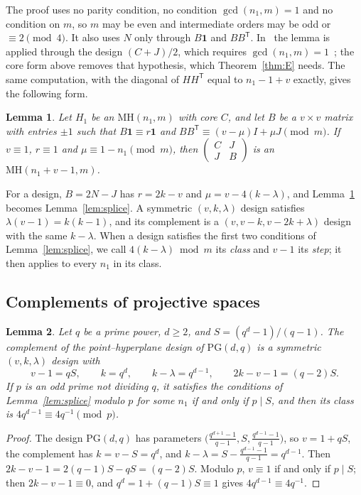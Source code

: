 \documentclass[10pt]{article}
\newtheorem{lemma}{Lemma}
\theoremstyle{remark}
\newcommand{\MH}{\mathrm{MH}}
\newcommand{\tr}{^{\mathsf T}}
\newcommand{\one}{\mathbf 1}
\newcommand{\PG}{\mathrm{PG}}
\begin{document}
The proof uses no parity condition, no condition $\gcd(n_1,m)=1$ and no condition on $m$, so $m$ may be even and intermediate orders may be odd or $\equiv2\pmod4$. It also uses $N$ only through $B\one$ and $BB\tr$. In~\cite{LS,K} the lemma is applied through the design $(C+J)/2$, which requires $\gcd(n_1,m)=1$~\cite[Lemma~3.4]{LS}; the core form above removes that hypothesis, which Theorem~\ref{thm:E} needs. The same computation, with the diagonal of $HH\tr$ equal to $n_1-1+v$ exactly, gives the following form.

\begin{lemma}\label{lem:general}
Let $H_1$ be an $\MH(n_1,m)$ with core $C$, and let $B$ be a $v\times v$ matrix with entries $\pm1$ such that $B\one\equiv r\one$ and $BB\tr\equiv(v-\mu)I+\mu J\pmod m$. If $v\equiv1$, $r\equiv1$ and $\mu\equiv1-n_1\pmod m$, then $\left(\begin{smallmatrix}C&J\\ J&B\end{smallmatrix}\right)$ is an $\MH(n_1+v-1,m)$.
\end{lemma}

For a design, $B=2N-J$ has $r=2k-v$ and $\mu=v-4(k-\lambda)$, and Lemma~\ref{lem:general} becomes Lemma~\ref{lem:splice}. A symmetric $(v,k,\lambda)$ design satisfies $\lambda(v-1)=k(k-1)$, and its complement is a $(v,v-k,v-2k+\lambda)$ design with the same $k-\lambda$. When a design satisfies the first two conditions of Lemma~\ref{lem:splice}, we call $4(k-\lambda)\bmod m$ its \emph{class} and $v-1$ its \emph{step}; it then applies to every $n_1$ in its class.

\subsection{Complements of projective spaces}
\begin{lemma}\label{lem:PG}
Let $q$ be a prime power, $d\ge2$, and $S=(q^d-1)/(q-1)$. The complement of the point--hyperplane design of $\PG(d,q)$ is a symmetric $(v,k,\lambda)$ design with
\[
v-1=qS,\qquad k=q^d,\qquad k-\lambda=q^{d-1},\qquad 2k-v-1=(q-2)S.
\]
If $p$ is an odd prime not dividing $q$, it satisfies the conditions of Lemma~\ref{lem:splice} modulo $p$ for some $n_1$ if and only if $p\mid S$, and then its class is $4q^{d-1}\equiv4q^{-1}\pmod p$.
\end{lemma}

\begin{proof}
The design $\PG(d,q)$ has parameters $\bigl(\tfrac{q^{d+1}-1}{q-1},S,\tfrac{q^{d-1}-1}{q-1}\bigr)$, so $v=1+qS$, the complement has $k=v-S=q^d$, and $k-\lambda=S-\tfrac{q^{d-1}-1}{q-1}=q^{d-1}$. Then $2k-v-1=2(q-1)S-qS=(q-2)S$. Modulo $p$, $v\equiv1$ if and only if $p\mid S$; then $2k-v-1\equiv0$, and $q^d=1+(q-1)S\equiv1$ gives $4q^{d-1}\equiv4q^{-1}$.
\end{proof}
\end{document}
